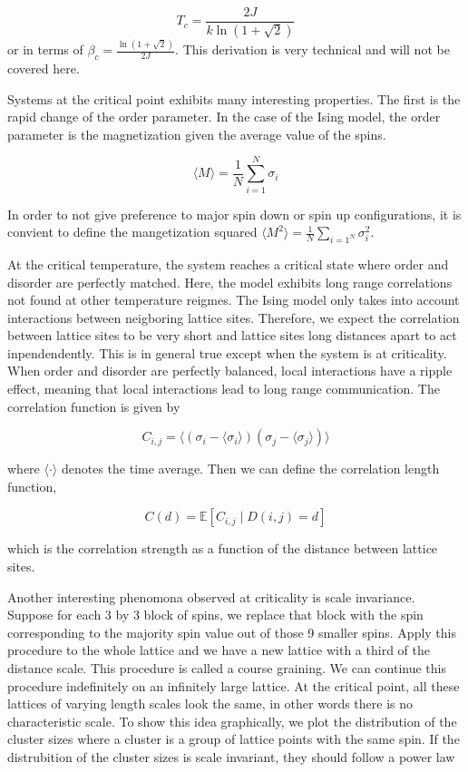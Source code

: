 \documentclass{article}
\begin{document}
\begin{equation}
    T_c = \frac{2J}{k \ln(1 + \sqrt2)}
\end{equation}
or in terms of $\beta_c = \frac{\ln(1 + \sqrt2)}{2J}$. This derivation is very technical and will not be covered here.




Systems at the critical point exhibits many interesting properties. The first is the rapid change of the order parameter.
In the case of the Ising model, the order parameter is the magnetization given the average value of the spins.

\begin{equation}
    \langle M \rangle = \frac1N \sum_{i=1}^N \sigma_i
\end{equation}

In order to not give preference to major spin down or spin up configurations, it is convient to define the mangetization squared
$\langle M^2 \rangle = \frac1N \sum_{i=1^N} \sigma_i^2$.

At the critical temperature, the system reaches a critical state where order and disorder are perfectly matched.
Here, the model exhibits long range correlations not found at other temperature reigmes. The Ising model only takes into account
interactions between neigboring lattice sites. Therefore, we expect the correlation between lattice sites to be very short and lattice sites
long distances apart to act inpendendently. This is in general true except when the system is at criticality. When order and disorder
are perfectly balanced, local interactions have a ripple effect, meaning that local interactions lead to long range communication. The correlation function is given by

\begin{equation}
    C_{i,j} = \langle (\sigma_i - \langle \sigma_i \rangle)(\sigma_j - \langle \sigma_j \rangle) \rangle
\end{equation}

where $\langle \cdot \rangle$ denotes the time average. Then we can define the correlation length function,

\begin{equation}
    C(d) = \mathbb{E} \left[ C_{i,j} \mid D(i,j) = d \right]
\end{equation}

which is the correlation strength as a function of the distance between lattice sites.

Another interesting phenomona observed at criticality is scale invariance. Suppose for each 3 by 3 block of spins, we replace that block
with the spin corresponding to the majority spin value out of those 9 smaller spins. Apply this procedure to the whole lattice and we have
a new lattice with a third of the distance scale. This procedure is called a course graining. We can continue this procedure indefinitely on an 
infinitely large lattice. At the critical point, all these lattices of varying length scales look the same, in other words there is no 
characteristic scale. To show this idea graphically, we plot the distribution of the cluster sizes where a cluster is a group of lattice points with
the same spin. If the distrubition of the cluster sizes is scale invariant, they should follow a power law
\end{document}
